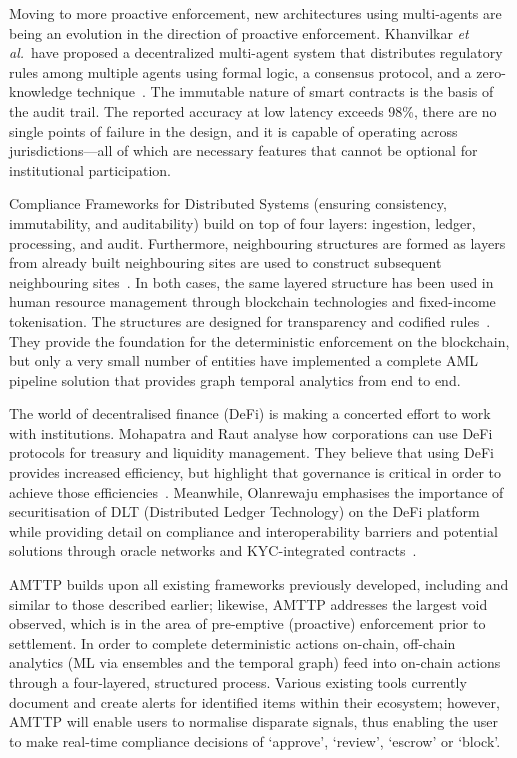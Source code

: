 \documentclass[journal]{IEEEtran}
\newcommand{\etal}{\textit{et al.}}
\begin{document}
Moving to more proactive enforcement, new architectures using multi-agents are being an evolution in the direction of proactive enforcement. Khanvilkar \etal\ have proposed a decentralized multi-agent system that distributes regulatory rules among multiple agents using formal logic, a consensus protocol, and a zero-knowledge technique~\cite{khanvilkar2025}. The immutable nature of smart contracts is the basis of the audit trail. The reported accuracy at low latency exceeds 98\%, there are no single points of failure in the design, and it is capable of operating across jurisdictions---all of which are necessary features that cannot be optional for institutional participation.

Compliance Frameworks for Distributed Systems (ensuring consistency, immutability, and auditability) build on top of four layers: ingestion, ledger, processing, and audit. Furthermore, neighbouring structures are formed as layers from already built neighbouring sites are used to construct subsequent neighbouring sites~\cite{gade2025}. In both cases, the same layered structure has been used in human resource management through blockchain technologies and fixed-income tokenisation. The structures are designed for transparency and codified rules~\cite{madanchian2026}. They provide the foundation for the deterministic enforcement on the blockchain, but only a very small number of entities have implemented a complete AML pipeline solution that provides graph temporal analytics from end to end.

The world of decentralised finance (DeFi) is making a concerted effort to work with institutions. Mohapatra and Raut analyse how corporations can use DeFi protocols for treasury and liquidity management. They believe that using DeFi provides increased efficiency, but highlight that governance is critical in order to achieve those efficiencies~\cite{mohapatra2025}. Meanwhile, Olanrewaju emphasises the importance of securitisation of DLT (Distributed Ledger Technology) on the DeFi platform while providing detail on compliance and interoperability barriers and potential solutions through oracle networks and KYC-integrated contracts~\cite{olanrewaju2025}.

AMTTP builds upon all existing frameworks previously developed, including and similar to those described earlier; likewise, AMTTP addresses the largest void observed, which is in the area of pre-emptive (proactive) enforcement prior to settlement. In order to complete deterministic actions on-chain, off-chain analytics (ML via ensembles and the temporal graph) feed into on-chain actions through a four-layered, structured process. Various existing tools currently document and create alerts for identified items within their ecosystem; however, AMTTP will enable users to normalise disparate signals, thus enabling the user to make real-time compliance decisions of `approve', `review', `escrow' or `block'.
\end{document}
